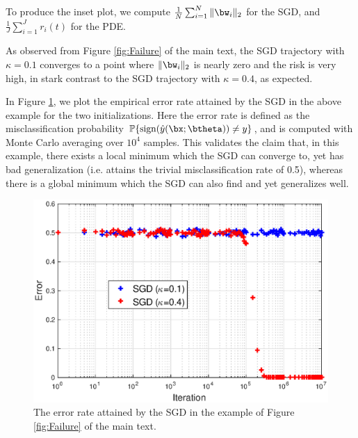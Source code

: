 \documentclass[11pt]{article}
\begin{document}
To produce the inset plot, we compute $\frac{1}{N}\sum_{i=1}^N\Vert\bw_i\Vert_2$ for the SGD, and $\frac{1}{J}\sum_{i=1}^Jr_i(t)$ for the PDE.

As observed from Figure \ref{fig:Failure} of the main text, the SGD trajectory with $\kappa=0.1$ converges to a point where $\Vert\bw_i\Vert_2$ is nearly zero and the risk is very high, in stark contrast to the SGD trajectory with $\kappa=0.4$, as expected.

 In Figure \ref{fig:num_fail_error}, we plot the empirical error rate attained by the SGD in the above example for the two initializations. Here the error rate is defined as the misclassification probability $\mathbb{P}\{{\rm sign}(\hat{y}(\bx;\btheta)) \neq y\}$, and is computed with Monte Carlo averaging over $10^4$ samples. This validates the claim that, in this example, there exists a local minimum which the SGD can converge to, yet has bad generalization (i.e. attains the trivial misclassification rate of 0.5), whereas there is a global minimum which the SGD can also find and yet generalizes well.

\begin{figure}[]
	\begin{center}
		\includegraphics[width=0.7\linewidth]{isoPDE_pwlinear_error_d320_n800_Delta50_step10.eps}
	\end{center}
	\caption{The error rate attained by the SGD in the example of Figure \ref{fig:Failure} of the main text.}
	\label{fig:num_fail_error}
\end{figure}

\appendix
\end{document}
